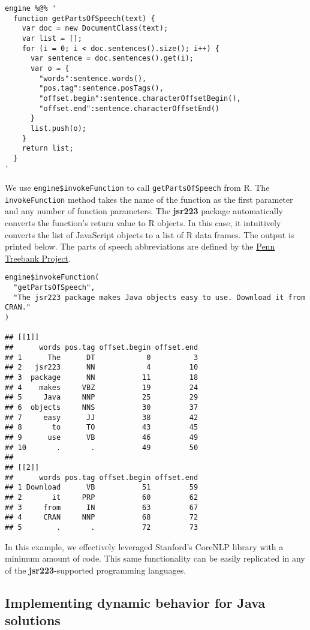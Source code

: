 \documentclass[
article,
11pt, %
a4paper, %
oneside, %
headinclude,footinclude, %
]{scrartcl}
\theoremstyle{definition} %
\theoremstyle{plain} %
\theoremstyle{remark} %
\newcommand{\pkg}[1]{\textbf{#1}}
\newcommand{\code}[1]{\texttt{#1}}
\begin{document}
\begin{verbatim}
engine %@% '
  function getPartsOfSpeech(text) {
    var doc = new DocumentClass(text);
    var list = [];
    for (i = 0; i < doc.sentences().size(); i++) {
      var sentence = doc.sentences().get(i);
      var o = {
        "words":sentence.words(),
        "pos.tag":sentence.posTags(),
        "offset.begin":sentence.characterOffsetBegin(),
        "offset.end":sentence.characterOffsetEnd()
      }
      list.push(o);
    }
    return list;
  }
'
\end{verbatim}
We use \code{engine\$invokeFunction} to call \code{getPartsOfSpeech} from R. The \code{invokeFunction} method takes the name of the function as the first parameter and any number of function parameters. The \pkg{jsr223} package automatically converts the function's return value to R objects. In this case, it intuitively converts the list of JavaScript objects to a list of R data frames. The output is printed below. The parts of speech abbreviations are defined by the \href{https://www.ling.upenn.edu/courses/Fall_2003/ling001/penn_treebank_pos.html}{Penn Treebank Project}. %

\begin{verbatim}
engine$invokeFunction(
  "getPartsOfSpeech",
  "The jsr223 package makes Java objects easy to use. Download it from CRAN."
)

## [[1]]
##      words pos.tag offset.begin offset.end
## 1      The      DT            0          3
## 2   jsr223      NN            4         10
## 3  package      NN           11         18
## 4    makes     VBZ           19         24
## 5     Java     NNP           25         29
## 6  objects     NNS           30         37
## 7     easy      JJ           38         42
## 8       to      TO           43         45
## 9      use      VB           46         49
## 10       .       .           49         50
## 
## [[2]]
##      words pos.tag offset.begin offset.end
## 1 Download      VB           51         59
## 2       it     PRP           60         62
## 3     from      IN           63         67
## 4     CRAN     NNP           68         72
## 5        .       .           72         73
\end{verbatim}

In this example, we effectively leveraged Stanford's CoreNLP library with a minimum amount of code. This same functionality can be easily replicated in any of the \pkg{jsr223}-supported programming languages.

\subsection{Implementing dynamic behavior for Java solutions}
\end{document}
